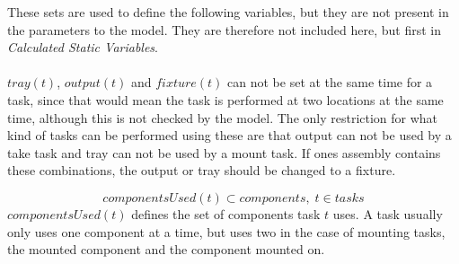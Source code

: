 \documentclass[10pt,a4paper]{report}
\begin{document}
These sets are used to define the following variables, but they are not present in the parameters to the model. They are therefore not included here, but first in \emph{Calculated Static Variables}.
\\\\
$tray(t)$, $output(t)$ and $fixture(t)$ can not be set at the same time for a task, since that would mean the task is performed at two locations at the same time, although this is not checked by the model. The only restriction for what kind of tasks can be performed using these are that output can not be used by a take task and tray can not be used by a mount task. If ones assembly contains these combinations, the output or tray should be changed to a fixture.

\begin{equation}\label{eq:25}
componentsUsed(t) \subset components, \; t \in tasks
\end{equation}
$componentsUsed(t)$ defines the set of components task $t$ uses. A task usually only uses one component at a time, but uses two in the case of mounting tasks, the mounted component and the component mounted on.
\end{document}
